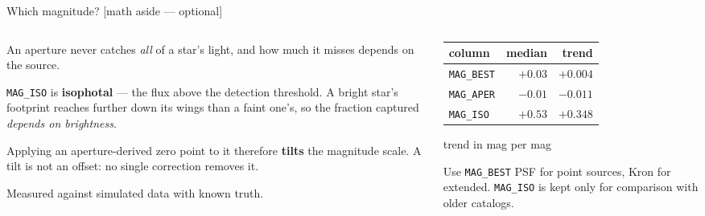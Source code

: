 \documentclass[10pt,aspectratio=169]{beamer}
\newcommand{\asidetag}{\hfill{\footnotesize\color{cassablue}[math aside --- optional]}}
\begin{document}
\begin{frame}{Which magnitude? \asidetag}
  \begin{columns}[T]
    \begin{column}{0.52\textwidth}
      An aperture never catches \emph{all} of a star's light, and how much it
      misses depends on the source.

      \medskip
      \texttt{MAG\_ISO} is \textbf{isophotal} --- the flux above the detection
      threshold. A bright star's footprint reaches further down its wings than a
      faint one's, so the fraction captured \emph{depends on brightness}.

      \medskip
      Applying an aperture-derived zero point to it therefore \textbf{tilts} the
      magnitude scale. A tilt is not an offset: no single correction removes it.

      \medskip
      {\footnotesize Measured against simulated data with known truth.}
    \end{column}
    \begin{column}{0.46\textwidth}
      \centering
      {\footnotesize
      \begin{tabular}{lrr}
        \toprule
        column & median & trend \\
        \midrule
        \texttt{MAG\_BEST} & $+0.03$ & $+0.004$ \\
        \texttt{MAG\_APER} & $-0.01$ & $-0.011$ \\
        \texttt{MAG\_ISO}  & $+0.53$ & $\mathbf{+0.348}$ \\
        \bottomrule
      \end{tabular}
      \par\medskip
      trend in mag per mag
      }

      \vspace{1em}
      \begin{block}{\small Use \texttt{MAG\_BEST}}
        \footnotesize PSF for point sources, Kron for extended.
        \texttt{MAG\_ISO} is kept only for comparison with older catalogs.
      \end{block}
    \end{column}
  \end{columns}
\end{frame}
\end{document}
